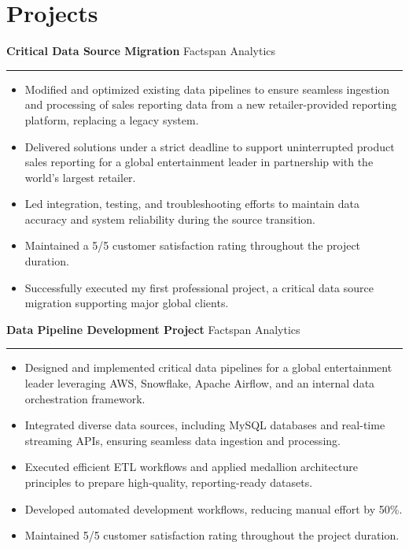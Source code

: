 \section*{Projects}
\textbf{Critical Data Source Migration} \hfill Factspan Analytics  
\vspace{0.2cm}  
\hrule  
\vspace{0.2cm}  
\begin{itemize}
    \item Modified and optimized existing data pipelines to ensure seamless ingestion and processing of sales reporting data from a new retailer-provided reporting platform, replacing a legacy system.
    \item Delivered solutions under a strict deadline to support uninterrupted product sales reporting for a global entertainment leader in partnership with the world’s largest retailer.
    \item Led integration, testing, and troubleshooting efforts to maintain data accuracy and system reliability during the source transition.
    \item Maintained a 5/5 customer satisfaction rating throughout the project duration.
    \item Successfully executed my first professional project, a critical data source migration supporting major global clients.
\end{itemize}
\vspace{0.5cm}
\textbf{Data Pipeline Development Project} \hfill Factspan Analytics
\vspace{0.2cm}
\hrule
\vspace{0.2cm}
\begin{itemize}
    \item Designed and implemented critical data pipelines for a global entertainment leader leveraging AWS, Snowflake, Apache Airflow, and an internal data orchestration framework.
    \item Integrated diverse data sources, including MySQL databases and real-time streaming APIs, ensuring seamless data ingestion and processing.
    \item Executed efficient ETL workflows and applied medallion architecture principles to prepare high-quality, reporting-ready datasets.
    \item Developed automated development workflows, reducing manual effort by 50\%.
    \item Maintained 5/5 customer satisfaction rating throughout the project duration.
\end{itemize}



